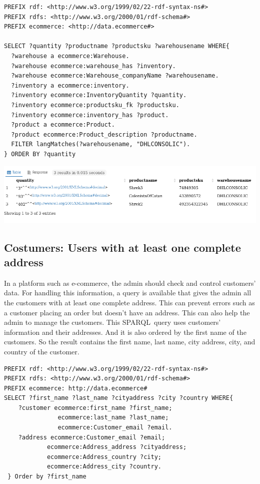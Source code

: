 \documentclass{article}
\begin{document}
\begin{lstlisting}[breaklines, frame=single]
PREFIX rdf: <http://www.w3.org/1999/02/22-rdf-syntax-ns#>
PREFIX rdfs: <http://www.w3.org/2000/01/rdf-schema#>
PREFIX ecommerce: <http://data.ecommerce#>

SELECT ?quantity ?productname ?productsku ?warehousename WHERE{
  ?warehouse a ecommerce:Warehouse.
  ?warehouse ecommerce:warehouse_has ?inventory.
  ?warehouse ecommerce:Warehouse_companyName ?warehousename.
  ?inventory a ecommerce:inventory.
  ?inventory ecommerce:InventoryQuantity ?quantity.
  ?inventory ecommerce:productsku_fk ?productsku.
  ?inventory ecommerce:inventory_has ?product.
  ?product a ecommerce:Product.
  ?product ecommerce:Product_description ?productname.
  FILTER langMatches(?warehousename, "DHLCONSOLIC").
} ORDER BY ?quantity
\end{lstlisting}

\begin{center}
   \includegraphics[scale=0.5]{OISreport-warehouse-query.png}
\end{center}

\newpage

\subsection{Costumers: Users with at least one complete address}
In a platform such as e-commerce, the admin should check and control customers' data. For handling this information, a query is available that gives the admin all the customers with at least one complete address. This can prevent errors such as a customer placing an order but doesn't have an address. This can also help the admin to manage the customers. This SPARQL query uses customers' information and their addresses. And it is also ordered by the first name of the customers. So the result contains the first name, last name, city address, city, and country of the customer.

\begin{lstlisting}[breaklines, frame=single]
PREFIX rdf: <http://www.w3.org/1999/02/22-rdf-syntax-ns#>
PREFIX rdfs: <http://www.w3.org/2000/01/rdf-schema#>
PREFIX ecommerce: http://data.ecommerce#
SELECT ?first_name ?last_name ?cityaddress ?city ?country WHERE{
	?customer ecommerce:first_name ?first_name;
			   ecommerce:last_name ?last_name;
			   ecommerce:Customer_email ?email.
	?address ecommerce:Customer_email ?email;
			ecommerce:Address_address ?cityaddress;
			ecommerce:Address_country ?city;
			ecommerce:Address_city ?country.
 } Order by ?first_name
\end{lstlisting}
\end{document}
